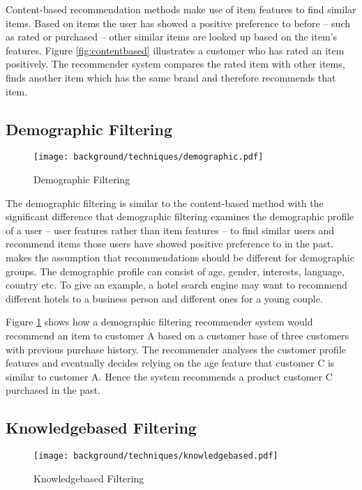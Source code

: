 Content-based recommendation methods make use of item features to find similar items. Based on items the user has showed a positive preference to before -- such as rated or purchased -- other similar items are looked up based on the item's features. Figure \ref{fig:contentbased} illustrates a customer who has rated an item positively. The recommender system compares the rated item with other items, finds another item which has the same brand and therefore recommends that item.

\subsection{Demographic Filtering}

\begin{figure}[ht]
    \texttt{[image: background/techniques/demographic.pdf]}
    \caption{Demographic Filtering}
    \label{fig:demographic}
\end{figure}

The demographic filtering is similar to the content-based method with the significant difference that demographic filtering examines the demographic profile of a user -- user features rather than item features -- to find similar users and recommend items those users have showed positive preference to in the past. \citet{burke07} makes the assumption that recommendations should be different for demographic groups. The demographic profile can consist of age, gender, interests, language, country etc. To give an example, a hotel search engine may want to recommend different hotels to a business person and different ones for a young couple.

Figure \ref{fig:demographic} shows how a demographic filtering recommender system would recommend an item to customer A based on a customer base of three customers with previous purchase history. The recommender analyses the customer profile features and eventually decides relying on the age feature that customer C is similar to customer A. Hence the system recommends a product customer C purchased in the past.

\subsection{Knowledgebased Filtering}

\begin{figure}[ht]
    \texttt{[image: background/techniques/knowledgebased.pdf]}
    \caption{Knowledgebased Filtering}
    \label{fig:knowledgebased}
\end{figure}

